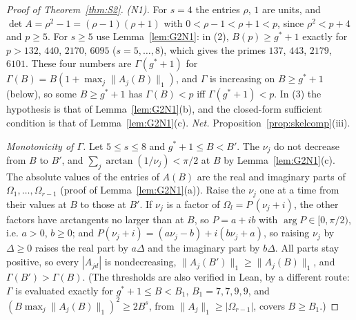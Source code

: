 \documentclass[11pt]{amsart}
\theoremstyle{definition}
\theoremstyle{plain}
\begin{document}
\begin{proof}[Proof of Theorem~\ref{thm:S2}]
\emph{(N1).} For $s=4$ the entries $\rho$, $1$ are units, and $\det A=\rho^2-1=(\rho-1)(\rho+1)$ with $0<\rho-1<\rho+1<p$, since $\rho^2<p+4$ and $p\ge5$. For $s\ge5$ use Lemma~\ref{lem:G2N1}: in (2), $B(p)\ge g^*+1$ exactly for $p>132$, $440$, $2170$, $6095$ ($s=5,\dots,8$), which gives the primes $137$, $443$, $2179$, $6101$. These four numbers are $\Gamma(g^*+1)$ for $\Gamma(B)=B(1+\max_j\|A_j(B)\|_1)$, and $\Gamma$ is increasing on $B\ge g^*+1$ (below), so some $B\ge g^*+1$ has $\Gamma(B)<p$ iff $\Gamma(g^*+1)<p$. In (3) the hypothesis is that of Lemma~\ref{lem:G2N1}(b), and the closed-form sufficient condition is that of Lemma~\ref{lem:G2N1}(c). \emph{Net.} Proposition~\ref{prop:skelcomp}(iii).

\emph{Monotonicity of $\Gamma$.} Let $5\le s\le8$ and $g^*+1\le B<B'$. The $\nu_j$ do not decrease from $B$ to $B'$, and $\sum_j\arctan(1/\nu_j)<\pi/2$ at $B$ by Lemma~\ref{lem:G2N1}(c). The absolute values of the entries of $A(B)$ are the real and imaginary parts of $\Omega_1,\dots,\Omega_{r-1}$ (proof of Lemma~\ref{lem:G2N1}(a)). Raise the $\nu_j$ one at a time from their values at $B$ to those at $B'$. If $\nu_j$ is a factor of $\Omega_l=P\,(\nu_j+i)$, the other factors have arctangents no larger than at $B$, so $P=a+ib$ with $\arg P\in[0,\pi/2)$, i.e. $a>0$, $b\ge0$; and $P(\nu_j+i)=(a\nu_j-b)+i(b\nu_j+a)$, so raising $\nu_j$ by $\Delta\ge0$ raises the real part by $a\Delta$ and the imaginary part by $b\Delta$. All parts stay positive, so every $|A_{jd}|$ is nondecreasing, $\|A_j(B')\|_1\ge\|A_j(B)\|_1$, and $\Gamma(B')>\Gamma(B)$. (The thresholds are also verified in Lean, by a different route: $\Gamma$ is evaluated exactly for $g^*+1\le B<B_1$, $B_1=7,7,9,9$, and $(B\max_j\|A_j(B)\|_1)^2\ge2B^s$, from $\|A_j\|_1\ge|\Omega_{r-1}|$, covers $B\ge B_1$.)


\end{proof}
\end{document}

